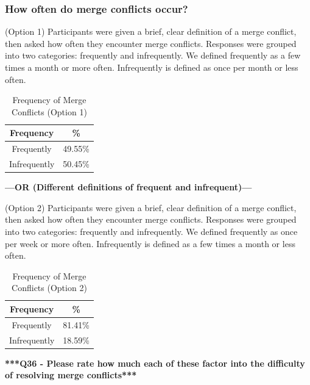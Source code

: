 \documentclass[conference]{IEEEtran}
\begin{document}
\subsubsection{How often do merge conflicts occur?}
(Option 1) Participants were given a brief, clear definition of a merge conflict, then asked how often they encounter merge conflicts. Responses were grouped into two categories: frequently and infrequently. We defined frequently as a few times a month or more often. Infrequently is defined as once per month or less often.

\begin{table}[!t]
\renewcommand{\arraystretch}{1.3}
\caption{Frequency of Merge Conflicts (Option 1)}
\label{roles_table}
\centering
\begin{tabular}{|c||c|}
\hline
Frequency & \%\\
\hline
Frequently & 49.55\%\\
Infrequently & 50.45\%\\
\hline
\end{tabular}
\end{table}

\textbf{---OR (Different definitions of frequent and infrequent)---}

(Option 2) Participants were given a brief, clear definition of a merge conflict, then asked how often they encounter merge conflicts. Responses were grouped into two categories: frequently and infrequently. We defined frequently as once per week or more often. Infrequently is defined as a few times a month or less often.

\begin{table}[!t]
\renewcommand{\arraystretch}{1.3}
\caption{Frequency of Merge Conflicts (Option 2)}
\label{roles_table}
\centering
\begin{tabular}{|c||c|}
\hline
Frequency & \%\\
\hline
Frequently & 81.41\%\\
Infrequently & 18.59\%\\
\hline
\end{tabular}
\end{table}

\textbf{***Q36 - Please rate how much each of these factor into the difficulty of resolving merge conflicts***}
\end{document}
